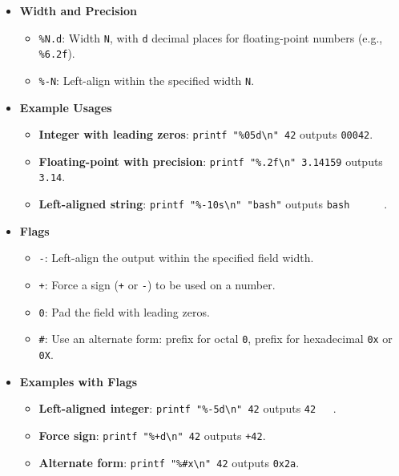 \documentclass{report}
\begin{document}
\begin{itemize}
    \item \textbf{Width and Precision}
    \begin{itemize}
        \item \verb|%N.d|: Width \verb|N|, with \verb|d| decimal places for floating-point numbers (e.g., \verb|%6.2f|).
        \item \verb|%-N|: Left-align within the specified width \verb|N|.
    \end{itemize}
    
    \item \textbf{Example Usages}
    \begin{itemize}
        \item \textbf{Integer with leading zeros}: \verb|printf "%05d\n" 42| outputs \verb|00042|.
        \item \textbf{Floating-point with precision}: \verb|printf "%.2f\n" 3.14159| outputs \verb|3.14|.
        \item \textbf{Left-aligned string}: \verb|printf "%-10s\n" "bash"| outputs \verb|bash      |.
    \end{itemize}
    
    \item \textbf{Flags}
    \begin{itemize}
        \item \verb|-|: Left-align the output within the specified field width.
        \item \verb|+|: Force a sign (\verb|+| or \verb|-|) to be used on a number.
        \item \verb|0|: Pad the field with leading zeros.
        \item \verb|#|: Use an alternate form: prefix for octal \verb|0|, prefix for hexadecimal \verb|0x| or \verb|0X|.
    \end{itemize}
    
    \item \textbf{Examples with Flags}
    \begin{itemize}
        \item \textbf{Left-aligned integer}: \verb|printf "%-5d\n" 42| outputs \verb|42   |.
        \item \textbf{Force sign}: \verb|printf "%+d\n" 42| outputs \verb|+42|.
        \item \textbf{Alternate form}: \verb|printf "%#x\n" 42| outputs \verb|0x2a|.
    \end{itemize}
\end{itemize}


    \pagebreak 
    \bigbreak \noindent 
\end{document}

